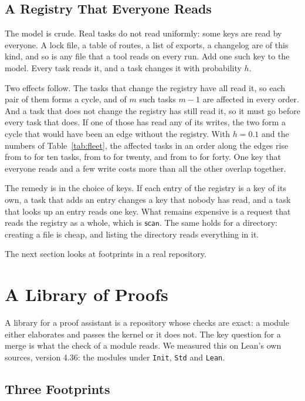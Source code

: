 \documentclass[acmsmall,nonacm,screen]{acmart}
\newcommand{\kw}[1]{\mathsf{#1}}
\newcommand{\scan}{\kw{scan}}
\begin{document}
\subsection{A Registry That Everyone Reads}

The model is crude. Real tasks do not read uniformly: some keys are read by everyone. A
lock file, a table of routes, a list of exports, a changelog are of this kind, and so is any
file that a tool reads on every run. Add one such key to the model. Every task reads it, and
a task changes it with probability $h$.

Two effects follow. The tasks that change the registry have all read it, so each pair of
them forms a cycle, and of $m$ such tasks $m - 1$ are affected in every order. And a task
that does not change the registry has still read it, so it must go before every task that
does. If one of those has read any of its writes, the two form a cycle that would have been
an edge without the registry. With $h = 0.1$ and the numbers of Table~\ref{tab:fleet}, the
affected tasks in an order along the edges rise from \exFleetBesta{} to \exFleetHota{} for
ten tasks, from \exFleetBestb{} to \exFleetHotb{} for twenty, and from \exFleetBestc{} to
\exFleetHotc{} for forty. One key that everyone reads and a few write costs more than all
the other overlap together.

The remedy is in the choice of keys. If each entry of the registry is a key of its own, a
task that adds an entry changes a key that nobody has read, and a task that looks up an
entry reads one key. What remains expensive is a request that reads the registry as a
whole, which is $\scan$. The same holds for a directory: creating a file is cheap, and
listing the directory reads everything in it.

The next section looks at footprints in a real repository.

\section{A Library of Proofs}
\label{sec:library}

A library for a proof assistant is a repository whose checks are exact: a module either
elaborates and passes the kernel or it does not. The key question for a merge is what the
check of a module reads. We measured this on Lean's own sources, version 4.36: the
\exModules{} modules under \texttt{Init}, \texttt{Std} and \texttt{Lean}.

\subsection{Three Footprints}
\end{document}
